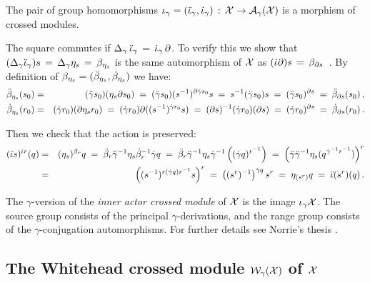 \begin{thm} \label{thm:iota}
The pair of group homomorphisms  
$\iota_{\gamma} = (\ddot{\iota}_{\gamma},\dot{\iota}_{\gamma}) 
 \,:\,  \mathcal{X} \to \mathcal{A}_{\gamma}(\mathcal{X})$
is a morphism of crossed modules.
\end{thm}
\begin{pf}
The square commutes if 
$\Delta_{\gamma}\,\ddot{\iota}_{\gamma} \,=\, \dot{\iota}_{\gamma}\,\partial$. 
To verify this we show that
$(\Delta_{\gamma}\ddot{\iota}_{\gamma})s \,=\, \Delta_{\gamma}\eta_s 
                                 \,=\, \beta_{\eta_s}$
is the same automorphism of  $\mathcal{X}$  as
$(\dot{\iota}\partial)s \,=\, \beta_{\partial s}$~. 
By definition of  $\beta_{\eta_s} = (\ddot{\beta}_{\eta_s},\dot{\beta}_{\eta_s})$  we have: 
\begin{eqnarray*}
\ddot{\beta}_{\eta_s}(s_0) 
  & = & (\ddot{\gamma} s_0)(\eta_s\partial s_0) 
  \;=\; (\ddot{\gamma} s_0)(s^{-1})^{\partial \ddot{\gamma} s_0}s
  \;=\; s^{-1}(\ddot{\gamma} s_0)s 
  \;=\; (\ddot{\gamma} s_0)^{\partial s} 
  \;=\; \ddot{\beta}_{\partial s}(s_0) \,, \\
\dot{\beta}_{\eta_s}(r_0) 
  & = & (\dot{\gamma} r_0)(\partial\eta_s r_0) 
  \;=\; (\dot{\gamma} r_0) \partial((s^{-1})^{\dot{\gamma} r_0}s)
  \;=\; (\partial s)^{-1}(\dot{\gamma} r_0)(\partial s) 
  \;=\; (\dot{\gamma} r_0)^{\partial s} 
  \;=\; \dot{\beta}_{\partial s}(r_0) \,. 
\end{eqnarray*}

\noindent
Then we check that the action is preserved:
\begin{eqnarray*} 
(\ddot{\iota} s)^{\dot{\iota} r}(q) 
  & = &  (\eta_s)^{\beta_r}q 
  \;=\;  \ddot{\beta}_r \ddot{\gamma}^{-1} \eta_s \dot{\beta}_r^{-1} \dot{\gamma} q 
  \;=\;  \ddot{\beta}_r \ddot{\gamma}^{-1} \eta_s \dot{\gamma}^{-1} \left( (\dot{\gamma} q)^{r^{-1}} \right) 
  \;=\;  \left( \ddot{\gamma} \ddot{\gamma}^{-1} \eta_s ( q^{\dot{\gamma}^{-1}r^{-1}} ) \right)^r \\ 
  & = &  \left( (s^{-1})^{r(\dot{\gamma} q)r^{-1}} s \right)^r 
  \;=\;  \left( (s^r)^{-1} \right)^{\dot{\gamma} q} s^r 
  \;=\;  \eta_{(s^r)}q 
  \;=\;  \ddot{\iota}(s^r)(q) \,.
\end{eqnarray*} 
\end{pf}

The $\gamma$-version of the \emph{inner actor crossed module} of $\mathcal{X}$ 
is the image $\iota_{\gamma}\mathcal{X}$. 
The source group consists of the principal $\gamma$-derivations, 
and the range group consists of the $\gamma$-conjugation automorphisms. 
For further details see Norrie's thesis \cite{nor2}. 



\subsection{The Whitehead crossed module $\mathcal{W}_{\gamma}(\mathcal{X})$ of $\mathcal{X}$} 
\label{subs:Whitehead-xmod}

